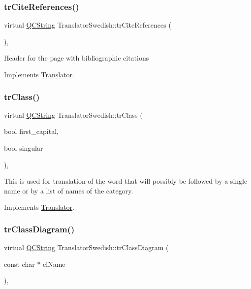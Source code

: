 \subsubsection{\texorpdfstring{trCiteReferences()}{trCiteReferences()}}
{\footnotesize\ttfamily virtual \mbox{\hyperlink{class_q_c_string}{Q\+C\+String}} Translator\+Swedish\+::tr\+Cite\+References (\begin{DoxyParamCaption}{ }\end{DoxyParamCaption})\hspace{0.3cm}{\ttfamily [inline]}, {\ttfamily [virtual]}}

Header for the page with bibliographic citations 

Implements \mbox{\hyperlink{class_translator}{Translator}}.

\mbox{\label{class_translator_swedish_a26acc40ddf619631b95b6d8dad5896ee}} 
\subsubsection{\texorpdfstring{trClass()}{trClass()}}
{\footnotesize\ttfamily virtual \mbox{\hyperlink{class_q_c_string}{Q\+C\+String}} Translator\+Swedish\+::tr\+Class (\begin{DoxyParamCaption}\item[{bool}]{first\+\_\+capital,  }\item[{bool}]{singular }\end{DoxyParamCaption})\hspace{0.3cm}{\ttfamily [inline]}, {\ttfamily [virtual]}}

This is used for translation of the word that will possibly be followed by a single name or by a list of names of the category. 

Implements \mbox{\hyperlink{class_translator}{Translator}}.

\mbox{\label{class_translator_swedish_a173aa4fb63d773ba2658f7dfdf649a5d}} 
\subsubsection{\texorpdfstring{trClassDiagram()}{trClassDiagram()}}
{\footnotesize\ttfamily virtual \mbox{\hyperlink{class_q_c_string}{Q\+C\+String}} Translator\+Swedish\+::tr\+Class\+Diagram (\begin{DoxyParamCaption}\item[{const char $\ast$}]{cl\+Name }\end{DoxyParamCaption})\hspace{0.3cm}{\ttfamily [inline]}, {\ttfamily [virtual]}}

